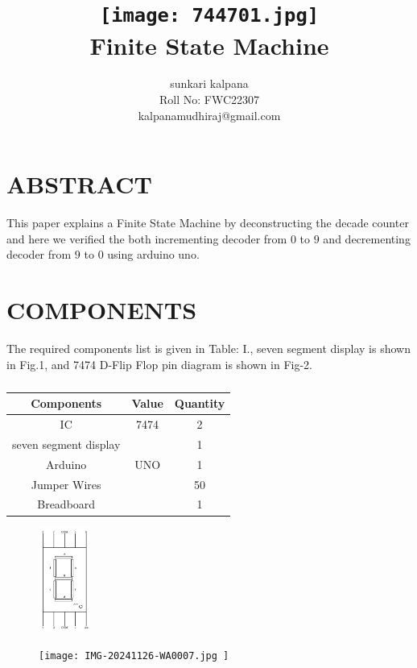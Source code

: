 \documentclass[conference]{IEEEtran}
\title{
\vspace{1cm}
{\texttt{[image: 744701.jpg]} \\ Finite State Machine} }
\author{sunkari kalpana\\ Roll No: FWC22307 \\ kalpanamudhiraj@gmail.com}
\begin{document}
\maketitle
 \section {ABSTRACT}
 This paper explains a Finite State Machine by deconstructing the decade counter and here we verified the both incrementing decoder from $0$ to $9$ and decrementing decoder from $9$ to $0$ using arduino uno.

\section{COMPONENTS}
The required components list is given in Table: I., seven segment display is shown in Fig.1, and 7474 D-Flip Flop pin diagram is shown in Fig-2.
\vspace{0.3cm}
 \begin{table} [htbp]
\centering
\begin{tabular}{| c | c | c |} \hline
Components & Value & Quantity \\\hline
IC & 7474 & 2 \\ \hline
seven segment display & & 1\\ \hline
Arduino & UNO & 1 \\ \hline
Jumper Wires &  & 50 \\ \hline
Breadboard & & 1 \\ 
\hline
\end{tabular}
\vspace{0.3cm}
\caption{\label{tab:widgets}}
\end{table}

\begin{figure}[h]                           
\centering                                 
\includegraphics[width=0.15\textwidth]{744703.jpg}                                           
\caption{\label{fig-1:Gates}}               
\end{figure}

\begin{figure}[h]                           
\centering                                 
\texttt{[image: IMG-20241126-WA0007.jpg  ]}                                           
\caption{\label{fig-2:Gates}}               
\end{figure}
\end{document}

